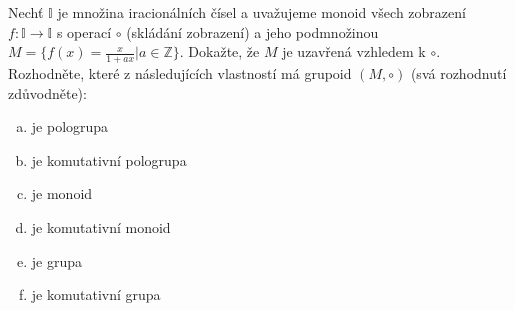 Nechť $\mathbb{I}$ je množina iracionálních čísel a uvažujeme monoid všech
zobrazení $f: \mathbb{I} \rightarrow \mathbb{I}$ s operací $\circ$ (skládání
zobrazení) a jeho podmnožinou $M = \{f(x) = \frac{x}{1+ax} | a \in
\mathbb{Z}\}$.  Dokažte, že $M$ je uzavřená vzhledem k $\circ$.  Rozhodněte,
které z následujících vlastností má grupoid $(M, \circ)$ (svá rozhodnutí
zdůvodněte):
\begin{enumerate}[a)]
	\item je pologrupa
	\item je komutativní pologrupa
	\item je monoid
	\item je komutativní monoid
	\item je grupa
	\item je komutativní grupa
\end{enumerate}

